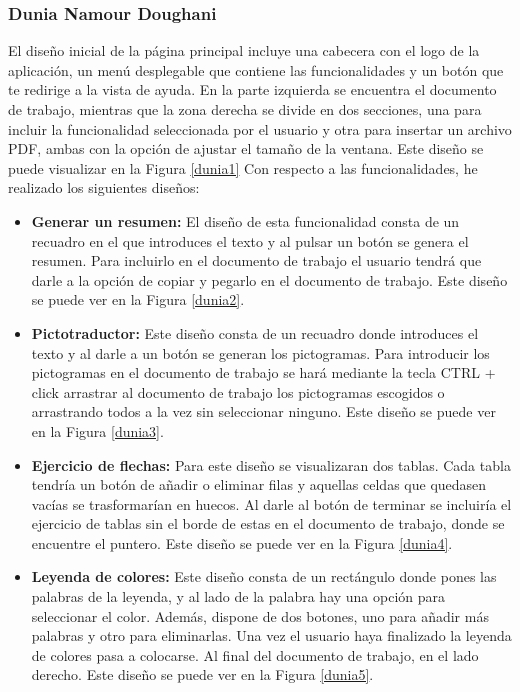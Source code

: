 \subsubsection{Dunia Namour Doughani}
El diseño inicial de la página principal incluye una cabecera con el logo de la aplicación, un menú desplegable que contiene las funcionalidades y un botón que te redirige a la vista de ayuda. En la parte izquierda se encuentra el documento de trabajo, mientras que la zona derecha se divide en dos secciones, una para incluir la funcionalidad seleccionada por el usuario y otra para insertar un archivo PDF, ambas con la opción de ajustar el tamaño de la ventana. Este diseño se puede visualizar en la Figura \ref{dunia1} Con respecto a las funcionalidades, he realizado los siguientes diseños:
\begin{itemize}
  \item \textbf{Generar un resumen:} El diseño de esta funcionalidad consta de un recuadro en el que introduces el texto y al pulsar un botón se genera el resumen. Para incluirlo en el documento de trabajo el usuario tendrá que darle a la opción de copiar y pegarlo en el documento de trabajo. Este diseño se puede ver en la Figura \ref{dunia2}.
  \item \textbf{Pictotraductor:} Este diseño consta de un recuadro donde introduces el texto y al darle a un botón se generan los pictogramas. Para introducir los pictogramas en el documento de trabajo se hará mediante la tecla CTRL + click arrastrar al documento de trabajo los pictogramas escogidos o arrastrando todos a la vez sin seleccionar ninguno. Este diseño se puede ver en la Figura \ref{dunia3}.
  \item \textbf{Ejercicio de flechas:} Para este diseño se visualizaran dos tablas. Cada tabla tendría un botón de añadir o eliminar filas y aquellas celdas que quedasen vacías se trasformarían en huecos. Al darle al botón de terminar se incluiría el ejercicio de tablas sin el borde de estas en el documento de trabajo, donde se encuentre el puntero. Este diseño se puede ver en la Figura \ref{dunia4}.
  \item  \textbf{Leyenda de colores:} Este diseño consta de un rectángulo donde pones las palabras de la leyenda, y al lado de la palabra hay una opción para seleccionar el color. Además, dispone de dos botones, uno para añadir más palabras y otro para eliminarlas. Una vez el usuario haya finalizado la leyenda de colores pasa a colocarse. Al final del documento de trabajo, en el lado derecho. Este diseño se puede ver en la Figura \ref{dunia5}.

\end{itemize}

